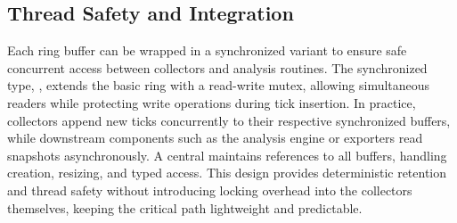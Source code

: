 \subsection{Thread Safety and Integration}
\label{subsec:ringbuffer_sync}

Each ring buffer can be wrapped in a synchronized variant to ensure safe concurrent access between collectors and analysis routines.
The synchronized type, , extends the basic ring with a read-write mutex, allowing simultaneous readers while protecting write operations during tick insertion.
In practice, collectors append new ticks concurrently to their respective synchronized buffers, while downstream components such as the analysis engine or exporters read snapshots asynchronously.
A central  maintains references to all buffers, handling creation, resizing, and typed access.
This design provides deterministic retention and thread safety without introducing locking overhead into the collectors themselves, keeping the critical path lightweight and predictable.